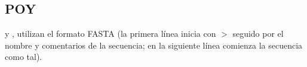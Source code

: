 \subsection{POY}

 y , utilizan el formato  FASTA (la primera l\'inea inicia con 
\begin{math}
>
\end{math}
seguido por el nombre y comentarios de la secuencia;  en la siguiente l\'inea comienza la secuencia como tal).\\
\\
\noindent
{}
